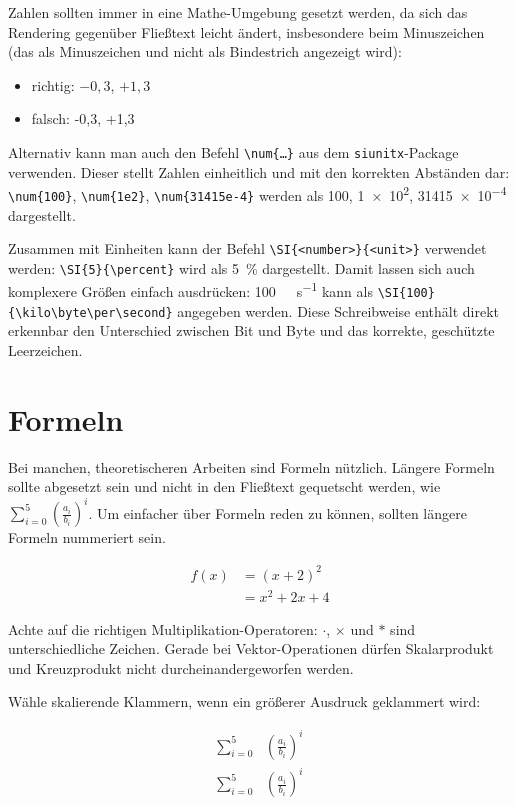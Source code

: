Zahlen sollten immer in eine Mathe-Umgebung gesetzt werden, da sich das Rendering gegenüber Fließtext leicht ändert, insbesondere beim Minuszeichen (das als Minuszeichen und nicht als Bindestrich angezeigt wird):

\begin{itemize}
    \item richtig: $-0,3$, $+1,3$
    \item falsch: -0,3, +1,3
\end{itemize}

Alternativ kann man auch den Befehl \verb|\num{…}| aus dem \verb|siunitx|-Package verwenden. Dieser stellt Zahlen einheitlich und mit den korrekten Abständen dar:
\verb|\num{100}|, \verb|\num{1e2}|, \verb|\num{31415e-4}| werden als \num{100}, \num{1e2}, \num{31415e-4} dargestellt.

Zusammen mit Einheiten kann der Befehl \verb|\SI{<number>}{<unit>}| verwendet werden: \verb|\SI{5}{\percent}| wird als \SI{5}{\percent} dargestellt.
Damit lassen sich auch komplexere Größen einfach ausdrücken: \SI{100}{\kilo\byte\per\second} kann als \verb|\SI{100}{\kilo\byte\per\second}| angegeben werden. Diese Schreibweise enthält direkt erkennbar den Unterschied zwischen Bit und Byte und das korrekte, geschützte Leerzeichen.

\section{Formeln}

Bei manchen, theoretischeren Arbeiten sind Formeln nützlich. Längere Formeln sollte abgesetzt sein und nicht in den Fließtext gequetscht werden, wie $\sum_{i=0}^{5} \left( \frac{a_i}{b_i} \right)^i$. Um einfacher über Formeln reden zu können, sollten längere Formeln nummeriert sein.

\begin{align}
    f(x) &= (x + 2) ^ 2\\
         &= x^2 + 2x + 4
\end{align}

Achte auf die richtigen Multiplikation-Operatoren: $\cdot$, $\times$ und $*$ sind unterschiedliche Zeichen. Gerade bei Vektor-Operationen dürfen Skalarprodukt und Kreuzprodukt nicht durcheinandergeworfen werden.

Wähle skalierende Klammern, wenn ein größerer Ausdruck geklammert wird:

\begin{align}
    \sum_{i=0}^{5} & \left( \frac{a_i}{b_i} \right)^i \\
    \sum_{i=0}^{5} & ( \frac{a_i}{b_i} )^i
\end{align}

